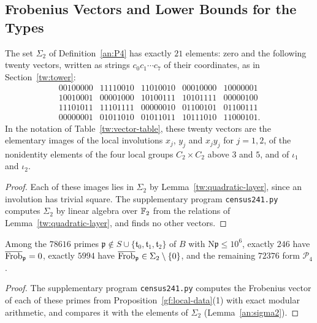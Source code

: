 \subsection{Frobenius Vectors and Lower Bounds for the Types}
\label{an:census}

\begin{lemma}\label{an:sigma2}
The set $\Sigma_2$ of Definition~\ref{an:P4} has exactly $21$ elements: zero
and the following twenty vectors, written as strings $c_0c_1\cdots c_7$ of
their coordinates, as in Section~\ref{tw:tower}:
\[
\begin{array}{ccccc}
 00100000&11110010&11010010&00010000&10000001\\
 10010001&00001000&10100111&10101111&00000100\\
 11101011&11101111&00000010&01100101&01100111\\
 00000001&01011010&01011011&10111010&11000101.
\end{array}
\]
In the notation of Table~\ref{tw:vector-table}, these twenty vectors are the
elementary images of the local involutions $x_j$, $y_j$ and $x_jy_j$ for
$j=1,2$, of the nonidentity elements of the four local groups
$C_2\times C_2$ above $3$ and $5$, and of $\iota_1$ and $\iota_2$.
\end{lemma}

\begin{proof}
Each of these images lies in $\Sigma_2$ by Lemma~\ref{tw:quadratic-layer},
since an involution has trivial square. The supplementary program
\texttt{census241.py} computes $\Sigma_2$ by linear algebra over $\mathbb F_2$
from the relations of Lemma~\ref{tw:quadratic-layer}, and finds no other
vectors.
\end{proof}

\begin{proposition}\label{an:census-prop}
Among the $78616$ primes
$\mathfrak p\notin S\cup\{\mathfrak t_0,\mathfrak t_1,\mathfrak t_2\}$ of
$B$ with $\mathrm N\mathfrak p\le10^6$, exactly $246$ have
$\overline{\operatorname{Frob}}_{\mathfrak p}=0$, exactly $5994$ have
$\overline{\operatorname{Frob}}_{\mathfrak p}\in\Sigma_2\setminus\{0\}$, and the remaining $72376$ form
$\mathcal P_4$.
\end{proposition}

\begin{proof}
The supplementary program \texttt{census241.py} computes the Frobenius
vector of each of these primes from Proposition~\ref{gf:local-data}(1) with
exact modular arithmetic, and compares it with the elements of $\Sigma_2$
(Lemma~\ref{an:sigma2}).
\end{proof}


